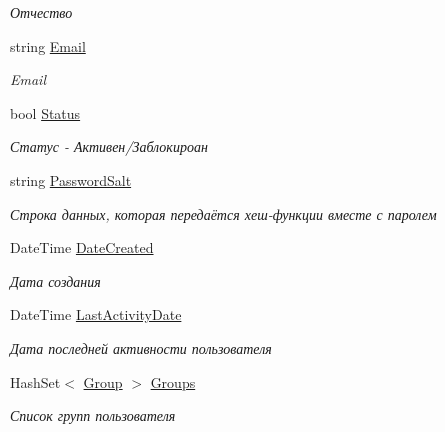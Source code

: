 \begin{DoxyCompactItemize}
\begin{DoxyCompactList}\small\item\em Отчество \end{DoxyCompactList}\item 
string \hyperlink{class_security_1_1_model_1_1_user_a612cac5badfb5c1df06d2840cbf72a15}{Email}
\begin{DoxyCompactList}\small\item\em Email \end{DoxyCompactList}\item 
bool \hyperlink{class_security_1_1_model_1_1_user_a172bd19370bbd6fdc089660cbef19b57}{Status}
\begin{DoxyCompactList}\small\item\em Статус -\/ Активен/Заблокироан \end{DoxyCompactList}\item 
string \hyperlink{class_security_1_1_model_1_1_user_ae80bc833d154d57b12db9284161852f4}{Password\+Salt}
\begin{DoxyCompactList}\small\item\em Строка данных, которая передаётся хеш-\/функции вместе с паролем \end{DoxyCompactList}\item 
Date\+Time \hyperlink{class_security_1_1_model_1_1_user_a091ed4e1c0ee019559d73c0f6f86d6c4}{Date\+Created}
\begin{DoxyCompactList}\small\item\em Дата создания \end{DoxyCompactList}\item 
Date\+Time \hyperlink{class_security_1_1_model_1_1_user_a8bf6f2549d691de6e859f233e6b261fa}{Last\+Activity\+Date}
\begin{DoxyCompactList}\small\item\em Дата последней активности пользователя \end{DoxyCompactList}\item 
Hash\+Set$<$ \hyperlink{class_security_1_1_model_1_1_group}{Group} $>$ \hyperlink{class_security_1_1_model_1_1_user_a3c29db40c3abfe11c88ba721c0000ff9}{Groups}
\begin{DoxyCompactList}\small\item\em Список групп пользователя \end{DoxyCompactList}\end{DoxyCompactItemize}



